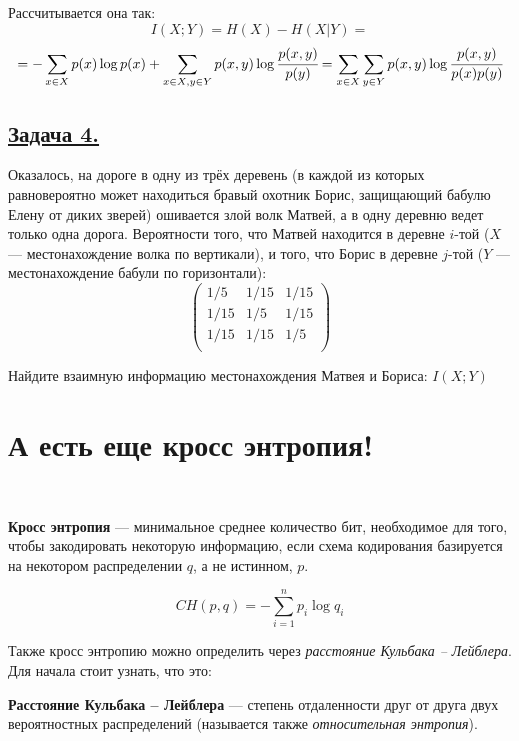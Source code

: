 Рассчитывается она так:
\[I(X; Y)=H(X)-H(X|Y)=\]
\[=-\sum\limits_{x\in X} p(x)\log p(x) +\sum\limits_{x\in X, y\in Y} p(x, y)\log \cfrac{p(x, y)}{p(y)} =
\sum\limits_{x\in X}\sum\limits_{y\in Y} p(x, y)\log \cfrac{p(x, y)}{p(x)p(y)} \]

\subsection*{\hyperref[sec:sol_problem4]{Задача 4.}}\label{sec:problem4}  Оказалось, на дороге в одну из трёх деревень (в каждой из которых равновероятно может находиться бравый охотник Борис, защищающий бабулю Елену от диких зверей) ошивается злой волк Матвей, а в одну деревню ведет только одна дорога. Вероятности того, что Матвей находится в деревне $i$-той ($X$ --- местонахождение волка по вертикали), и того, что Борис в деревне $j$-той ($Y$ --- местонахождение бабули по горизонтали):
\[\begin{pmatrix}
    1/5 & 1/15 & 1/15 \\
    1/15 & 1/5 & 1/15 \\
    1/15 & 1/15 & 1/5 \\
\end{pmatrix} \]

Найдите взаимную информацию местонахождения Матвея и Бориса: $I(X; Y)$

\section*{А есть еще кросс энтропия!}~\
\\

\begin{siderules}
    \textbf{Кросс энтропия} --- минимальное среднее количество бит, необходимое для того, чтобы закодировать некоторую информацию, если схема кодирования базируется на некотором распределении $q$, а не истинном, $p$.
\end{siderules}

\[CH(p, q)=-\sum\limits_{i=1}^{n}p_i\log q_i \]

Также кросс энтропию можно определить через \textit{расстояние Кульбака -- Лейблера}. Для начала стоит узнать, что это:

\begin{siderules}
    \textbf{Расстояние Кульбака -- Лейблера} --- степень отдаленности друг от друга двух вероятностных распределений (называется также \textit{относительная энтропия}). \end{siderules}
    

